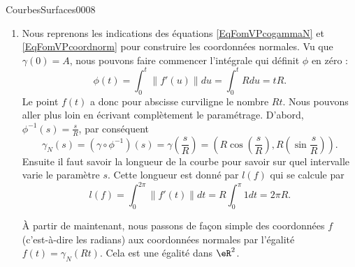 \begin{corrige}{CourbesSurfaces0008}

	\begin{enumerate}
		\item
				
			Nous reprenons les indications des équations \eqref{EqFomVPcogammaN} et \eqref{EqFomVPcoordnorm} pour construire les coordonnées normales. Vu que $\gamma(0)=A$, nous pouvons faire commencer l'intégrale qui définit $\phi$ en zéro :
			\begin{equation}
				\phi(t)=\int_0^t\| f'(u) \|du=\int_0^t Rdu=tR.
			\end{equation}
			Le point $f(t)$ a donc pour abscisse curviligne le nombre $Rt$. Nous pouvons aller plus loin en écrivant complètement le paramétrage. D'abord, $\phi^{-1}(s)=\frac{ s }{ R }$, par conséquent
			\begin{equation}
				\gamma_N(s)=(\gamma\circ\phi^{-1})(s)=\gamma(\frac{ s }{ R })=\left( R\cos(\frac{ s }{ R }),R(\sin\frac{ s }{ R }) \right).
			\end{equation}
			Ensuite il faut savoir la longueur de la courbe pour savoir sur quel intervalle varie le paramètre $s$. Cette longueur est donné par $l(f)$ qui se calcule par
			\begin{equation}
				l(f)=\int_0^{2\pi}\| f'(t) \|dt=R\int_0^{\pi}1dt=2\pi R.
			\end{equation}
	
			À partir de maintenant, nous passons de façon simple des coordonnées $f$ (c'est-à-dire les radians) aux coordonnées normales par l'égalité $f(t)=\gamma_N(Rt)$. Cela est une égalité dans $\eR^2$.


\end{enumerate}
\end{corrige}
